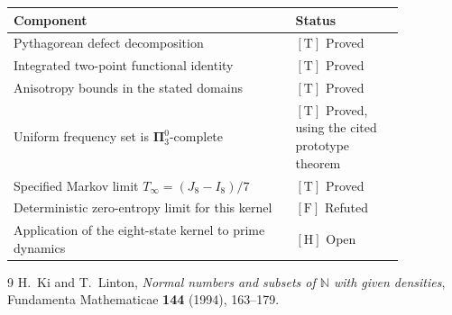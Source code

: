 \documentclass[11pt,a4paper]{article}
\begin{document}
\begin{center}
\begin{tabular}{>{\raggedright\arraybackslash}p{0.62\linewidth}|
                >{\raggedright\arraybackslash}p{0.24\linewidth}}
\hline
\textbf{Component} & \textbf{Status}\\
\hline
Pythagorean defect decomposition & $[\mathrm T]$ Proved\\
Integrated two-point functional identity & $[\mathrm T]$ Proved\\
Anisotropy bounds in the stated domains & $[\mathrm T]$ Proved\\
Uniform frequency set is $\mathbf{\Pi}^0_3$-complete
& $[\mathrm T]$ Proved, using the cited prototype theorem\\
Specified Markov limit $T_\infty=(J_8-I_8)/7$ & $[\mathrm T]$ Proved\\
Deterministic zero-entropy limit for this kernel & $[\mathrm F]$ Refuted\\
Application of the eight-state kernel to prime dynamics & $[\mathrm H]$ Open\\
\hline
\end{tabular}
\end{center}

\begin{thebibliography}{9}
H.~Ki and T.~Linton,
\emph{Normal numbers and subsets of $\mathbb N$ with given densities},
Fundamenta Mathematicae \textbf{144} (1994), 163--179.
\end{thebibliography}
\end{document}
